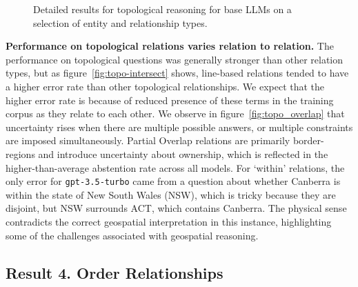 \begin{figure}[h]
    \centering
    \hfill
    \hfill
    \caption{Detailed results for topological reasoning for base LLMs on a selection of entity and relationship types.}
    \label{fig:topo_plots}
\end{figure}

\textbf{Performance on topological relations varies relation to relation.}
The performance on topological questions was generally stronger than other relation types, but as figure~\ref{fig:topo-intersect} shows, line-based relations tended to have a higher error rate than other topological relationships. 
We expect that the higher error rate is because of reduced presence of these terms in the training corpus as they relate to each other. 
We observe in figure~\ref{fig:topo_overlap} that uncertainty rises when there are multiple possible answers, or multiple constraints are imposed simultaneously. 
Partial Overlap relations are primarily border-regions and introduce uncertainty about ownership, which is reflected in the higher-than-average abstention rate across all models.
For `within' relations, the only error for \texttt{gpt-3.5-turbo} came from a question about whether Canberra is within the state of New South Wales (NSW), which is tricky because they are disjoint, but NSW surrounds ACT, which contains Canberra. 
The physical sense contradicts the correct geospatial interpretation in this instance, highlighting some of the challenges associated with geospatial reasoning.



\subsection{Result 4. Order Relationships}

